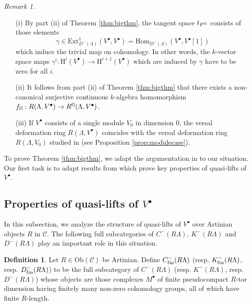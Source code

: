 \documentclass{amsart}
\theoremstyle{plain}
\theoremstyle{definition}
\newtheorem{dfn}[thm]{Definition}
\theoremstyle{remark}
\newtheorem{rem}[thm]{Remark}
\begin{document}
\begin{rem}
\label{rem:bigthm}
\hspace*{1em}
\begin{itemize}
\item[(i)]
By part (ii) of Theorem \ref{thm:bigthm},
the tangent space $t_{F^{\mathrm{f\/l}}}$ consists of those elements
$$\gamma \in\mathrm{Ext}^1_{D^-(\Lambda)}(V^\bullet,V^\bullet)=\mathrm{Hom}_{D^-(\Lambda)}(
V^\bullet,V^\bullet[1])$$ which induce the trivial map on cohomology. In other words,
the $k$-vector space maps $\gamma^i:{\mathrm{H}}^i(V^\bullet)\to {\mathrm{H}}^{i+1}(V^\bullet)$ which are
induced by $\gamma$ have to be zero for all $i$.
\item[(ii)]
It follows from part (ii) of Theorem \ref{thm:bigthm} that there exists a non-canonical
surjective continuous $k$-algebra homomorphism
$f_{\mathrm{f\/l}}: R(\Lambda,V^\bullet) \to R^{\mathrm{f\/l}}(\Lambda,V^\bullet)$.
\item[(iii)]
If $V^\bullet$ consists of a single module $V_0$ in dimension $0$,
the versal deformation ring $R(\Lambda,V^\bullet)$ coincides with the versal deformation
ring $R(\Lambda,V_0)$ studied in \cite{blehervelez} (see Proposition \ref{prop:modulecase}).
\end{itemize}
\end{rem}

To prove Theorem \ref{thm:bigthm}, we adapt the argumentation in \cite{bcderived} to our situation.
Our first task is to adapt results from \cite[Sects.  3, 4 and 14]{bcderived} which
prove key properties of quasi-lifts of $V^\bullet$.

\subsection{Properties of quasi-lifts of $V^\bullet$}
\label{s:quasilifts}

In this subsection, 
we analyze the structure of quasi-lifts of $V^\bullet$ over Artinian objects $R$ in $\mathcal{C}$.
The following full subcategories of $C^{-}(R\Lambda)$, $K^{-}(R\Lambda)$ and 
$D^{-}(R\Lambda)$ play an important role in this situation.

\begin{dfn}
\label{dfn:fincategory}
Let $R \in \mathrm{Ob}(\mathcal {C})$ be Artinian.  Define $C^{-}_{\mathrm{f\/in}}(R\Lambda)$ 
(resp. $K^{-}_{\mathrm{f\/in}}(R\Lambda)$, resp. $D^{-}_{\mathrm{f\/in}}(R\Lambda)$) to
be the full subcategory of $C^{-}(R\Lambda)$ (resp. $K^{-}(R\Lambda)$, resp. 
$D^{-}(R\Lambda)$) whose objects are those complexes
$M^\bullet$ of finite pseudocompact $R$-tor dimension having finitely many 
non-zero cohomology groups, all of which have  finite $R$-length.  
\end{dfn}
\end{document}
